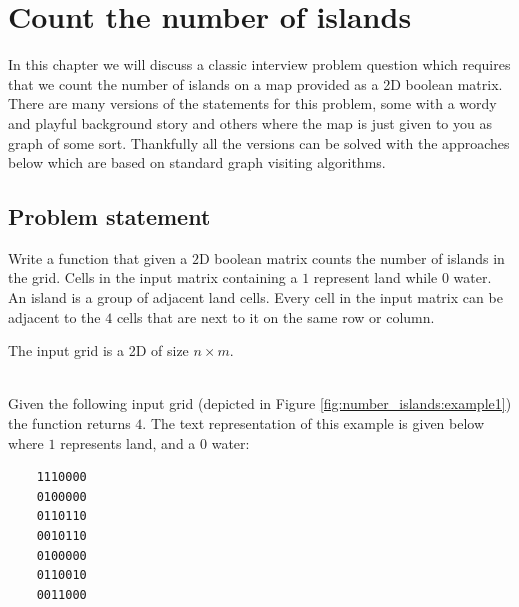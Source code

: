%

\chapter{Count the number of islands}
\label{ch:number_islands}
In this chapter we will discuss a classic interview problem question which requires that we
count the number of islands on a map provided as a 2D boolean matrix. There are many
versions of the statements for this problem, some with a wordy and playful background
story and others where the map is just given to you as graph of some sort. Thankfully all the
versions can be solved with the approaches below which  are based on standard graph visiting algorithms.

\section{Problem statement}
\begin{exercise}
Write a function that given a $2$D boolean matrix counts the number of islands in the grid. Cells in
the input matrix containing a $1$ represent land while $0$  water. An island is a group of adjacent
land cells. Every cell in the input matrix can be adjacent to the $4$ cells that are next to it on
the same row or column.

The input grid is a 2D  of size $n\times m$. 
	\begin{example}
		\hfill \\
		Given the following input grid (depicted in Figure \ref{fig:number_islands:example1}) the
		function returns $4$. The text representation of this example is given below where $1$
		represents land, and a $0$ water:	
	\begin{verbatim}
	1110000
	0100000
	0110110
	0010110
	0100000
	0110010
	0011000
	\end{verbatim}
	\end{example}

\end{exercise}

